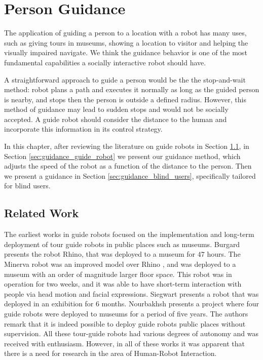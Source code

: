 \chapter{Person Guidance}
\label{chapter:person_guidance}

The application of guiding a person to a location with a robot has many uses, such as giving tours in museums, showing a location to visitor and helping the visually impaired navigate. We think the guidance behavior is one of the most fundamental capabilities a socially interactive robot should have.

A straightforward approach to guide a person would be the the stop-and-wait method: robot plans a path and executes it normally as long as the guided person is nearby, and stops then the person is outside a defined radius. However, this method of guidance may lead to sudden stops and would not be socially accepted. A guide robot should consider the distance to the human and incorporate this information in its control strategy.

In this chapter, after reviewing the literature on guide robots in Section \ref{sec:guidance_related_work}, in Section \ref{sec:guidance_guide_robot} we present our guidance method, which adjusts the speed of the robot as a function of the distance to the person. Then we present a guidance in Section \ref{sec:guidance_blind_users}, specifically tailored for blind users.

\section{Related Work}
\label{sec:guidance_related_work}

The earliest works in guide robots focused on the implementation and long-term deployment of tour guide robots in public places such as museums. Burgard \cite{burgard1998interactive} presents the robot Rhino, that was deployed to a museum for $47$ hours. The Minerva robot was an improved model over Rhino \cite{thrun1999minerva}, and was deployed to a museum with an order of magnitude larger floor space. This robot was in operation for two weeks, and it was able to have short-term interaction with people via head motion and facial expressions. Siegwart \cite{siegwart2003robox} presents a robot that was deployed in an exhibition for 6 months. Nourbakhsh \cite{nourbakhsh2003mobot} presents a project where four guide robots were deployed to museums for a period of five years. The authors remark that it is indeed possible to deploy guide robots public places without supervision. All these tour-guide robots had various degrees of autonomy and was received with enthusiasm. However, in all of these works it was apparent that there is a need for research in the area of Human-Robot Interaction.

